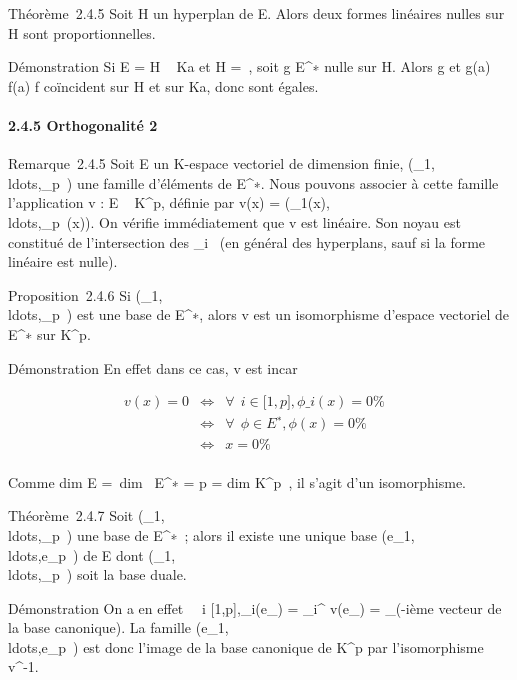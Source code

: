 \documentclass[]{article}
\begin{document}
Théorème~2.4.5 Soit H un hyperplan de E. Alors deux formes linéaires
nulles sur H sont proportionnelles.

Démonstration Si E = H \oplus~ Ka et H =\
\mathrmKerf, soit g \in E^∗ nulle sur H.
Alors g et  g(a) \over f(a) f coïncident sur H et sur
Ka, donc sont égales.

\paragraph{2.4.5 Orthogonalité 2}

Remarque~2.4.5 Soit E un K-espace vectoriel de dimension finie,
(\phi\_1,\\ldots,\phi\_p~)
une famille d'éléments de E^∗. Nous pouvons associer à cette
famille l'application v : E \rightarrow~ K^p, définie par v(x) =
(\phi\_1(x),\\ldots,\phi\_p~(x)).
On vérifie immédiatement que v est linéaire. Son noyau est constitué de
l'intersection des
\mathrmKer\phi\_i~ (en
général des hyperplans, sauf si la forme linéaire est nulle).

Proposition~2.4.6 Si
(\phi\_1,\\ldots,\phi\_p~)
est une base de E^∗, alors v est un isomorphisme d'espace
vectoriel de E^∗ sur K^p.

Démonstration En effet dans ce cas, v est in\jmathective car

\begin{align*} v(x) = 0&
\Leftrightarrow & \forall~~i \in
{[}1,p{]}, \phi\_i(x) = 0\%& \\ &
\Leftrightarrow & \forall~~\phi \in
E^∗, \phi(x) = 0 \%& \\ &
\Leftrightarrow & x = 0 \%&
\\ \end{align*}

Comme dim E =\ dim~
E^∗ = p = dim K^p~, il
s'agit d'un isomorphisme.

Théorème~2.4.7 Soit
(\phi\_1,\\ldots,\phi\_p~)
une base de E^∗~; alors il existe une unique base
(e\_1,\\ldots,e\_p~)
de E dont
(\phi\_1,\\ldots,\phi\_p~)
soit la base duale.

Démonstration On a en effet \forall~~i \in
{[}1,p{]},\phi\_i(e\_\jmath) = \delta\_i^\jmath
\Leftrightarrow v(e\_\jmath) = \epsilon\_\jmath (\jmath-ième
vecteur de la base canonique). La famille
(e\_1,\\ldots,e\_p~)
est donc l'image de la base canonique de K^p par
l'isomorphisme v^-1.
\end{document}
